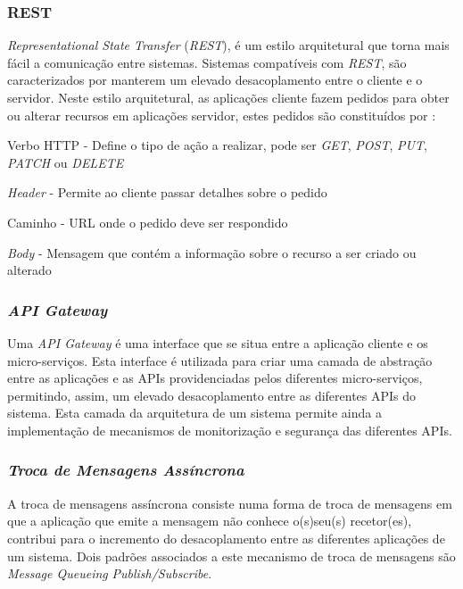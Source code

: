\subsubsection{REST}
\emph{Representational State Transfer} (\emph{REST}), é um estilo arquitetural que torna mais fácil a comunicação entre sistemas. Sistemas compatíveis com \emph{REST}, são caracterizados por manterem um elevado desacoplamento entre o cliente e o servidor.
Neste estilo arquitetural, as aplicações cliente fazem pedidos para obter ou alterar recursos em aplicações servidor, estes pedidos são constituídos por \cite{rest}:
\begin{description}
    \item Verbo HTTP - Define o tipo de ação a realizar, pode ser \emph{GET}, \emph{POST}, \emph{PUT}, \emph{PATCH} ou \emph{DELETE}
    \item \emph{Header} - Permite ao cliente passar detalhes sobre o pedido
    \item Caminho - URL onde o pedido deve ser respondido
    \item \emph{Body} - Mensagem que contém a informação sobre o recurso a ser criado ou alterado
\end{description}

\subsubsection{\emph{API Gateway}} \label{api_gateway}
Uma \emph{API Gateway} é uma interface que se situa entre a aplicação cliente e os micro-serviços. Esta interface é utilizada para criar uma camada de abstração entre as aplicações e as APIs providenciadas pelos diferentes micro-serviços, permitindo, assim, um elevado desacoplamento entre as diferentes APIs do sistema.
Esta camada da arquitetura de um sistema permite ainda a implementação de mecanismos de monitorização e segurança das diferentes APIs.

\subsubsection{\emph{Troca de Mensagens Assíncrona}} \label{troca_mensagens_assincrona}
A troca de mensagens assíncrona consiste numa forma de troca de mensagens em que a aplicação que emite a mensagem não conhece o(s)seu(s) recetor(es), contribui para o incremento do desacoplamento entre as diferentes aplicações de um sistema.
Dois padrões associados a este mecanismo de troca de mensagens são \emph{Message Queueing} \emph{Publish/Subscribe}.

